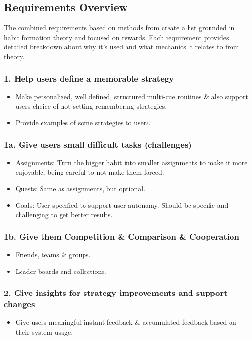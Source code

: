 \subsection{Requirements Overview}

The combined requirements based on methods from \cite{thesis_kathy, article_taxonomy_motivational_affordances_meaningful} create a list grounded in habit formation theory and focused on rewards. Each requirement provides detailed breakdown about why it's used and what mechanics it relates to from theory.

\subsubsection*{1. Help users define a memorable strategy}
  \begin{itemize}
    \item Make personalized, well defined, structured multi-cue routines \& also support users choice of not setting remembering strategies.
    \item Provide examples of some strategies to users.
  \end{itemize}

\subsubsection*{1a. Give users small difficult tasks (challenges)}
  \begin{itemize}
    \item Assignments: Turn the bigger habit into smaller assignments to make it more enjoyable, being careful to not make them forced.
    \item Quests: Same as assignments, but optional.
    \item Goals: User specified to support user autonomy. Should be specific and challenging to get better results.
  \end{itemize}

\subsubsection*{1b. Give them Competition \& Comparison \& Cooperation}
  \begin{itemize}
    \item Friends, teams \& groups.
    \item Leader-boards and collections.
  \end{itemize}

\subsubsection*{2. Give insights for strategy improvements and support changes}
  \begin{itemize}
    \item Give users meaningful instant feedback \& accumulated feedback based on their system usage.
  \end{itemize}


